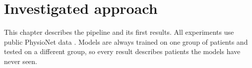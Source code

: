 \chapter{Investigated approach}
\label{chapter:proposedApproach}

This chapter describes the pipeline and its first results. All experiments use public PhysioNet data \cite{goldberger2000physiobank}. Models are always trained on one group of patients and tested on a different group, so every result describes patients the models have never seen.


